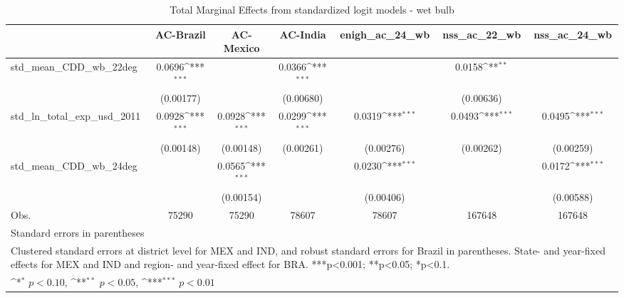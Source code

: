 \begin{table}[htbp]\centering
\def\sym#1{\ifmmode^{#1}\else\(^{#1}\)\fi}
\caption{Total Marginal Effects from standardized logit models - wet bulb}
\begin{tabular}{l*{6}{c}}
\hline\hline
            &\multicolumn{1}{c}{AC-Brazil}&\multicolumn{1}{c}{AC-Mexico}&\multicolumn{1}{c}{AC-India}&\multicolumn{1}{c}{enigh\_ac\_24\_wb}&\multicolumn{1}{c}{nss\_ac\_22\_wb}&\multicolumn{1}{c}{nss\_ac\_24\_wb}\\
\hline
std\_mean\_CDD\_wb\_22deg&      0.0696\sym{***}&                     &      0.0366\sym{***}&                     &      0.0158\sym{**} &                     \\
            &   (0.00177)         &                     &   (0.00680)         &                     &   (0.00636)         &                     \\
std\_ln\_total\_exp\_usd\_2011&      0.0928\sym{***}&      0.0928\sym{***}&      0.0299\sym{***}&      0.0319\sym{***}&      0.0493\sym{***}&      0.0495\sym{***}\\
            &   (0.00148)         &   (0.00148)         &   (0.00261)         &   (0.00276)         &   (0.00262)         &   (0.00259)         \\
std\_mean\_CDD\_wb\_24deg&                     &      0.0565\sym{***}&                     &      0.0230\sym{***}&                     &      0.0172\sym{***}\\
            &                     &   (0.00154)         &                     &   (0.00406)         &                     &   (0.00588)         \\
\hline
Obs.        &       75290         &       75290         &       78607         &       78607         &      167648         &      167648         \\
\hline\hline
\multicolumn{7}{l}{\footnotesize Standard errors in parentheses}\\
\multicolumn{7}{l}{\footnotesize Clustered standard errors at district level for MEX and IND, and robust standard errors for Brazil in parentheses. State- and year-fixed effects for MEX and IND and region- and year-fixed effect for BRA. ***p<0.001; **p<0.05; *p<0.1.}\\
\multicolumn{7}{l}{\footnotesize \sym{*} \(p<0.10\), \sym{**} \(p<0.05\), \sym{***} \(p<0.01\)}\\
\end{tabular}
\end{table}
